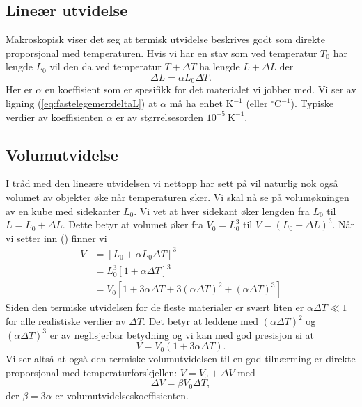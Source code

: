 \subsection{Lineær utvidelse}
Makroskopisk viser det seg at termisk utvidelse beskrives godt som direkte proporsjonal med temperaturen. Hvis vi har en stav som ved temperatur $T_0$ har lengde $L_0$ vil den da ved temperatur $T+\Delta T$ ha lengde $L+\Delta L$ der
\begin{equation}
	\Delta L = \alpha L_0\Delta T.
	\label{eq:fastelegemer:deltaL}
\end{equation}
Her er $\alpha$ en koeffisient som er spesifikk for det materialet vi jobber med. Vi ser av ligning (\ref{eq:fastelegemer:deltaL}) at $\alpha$ må ha enhet $\mathrm{K}^{-1}$ (eller $\mathrm{^\circ C}^{-1}$). Typiske verdier av koeffisienten $\alpha$ er av størrelsesorden $10^{-5}~\mathrm{K}^{-1}$.

\subsection{Volumutvidelse}
I tråd med den lineære utvidelsen vi nettopp har sett på vil naturlig nok også volumet av objekter øke når temperaturen øker. Vi skal nå se på volumøkningen av en kube med sidekanter $L_0$. Vi vet at hver sidekant øker lengden fra $L_0$ til $L = L_0+\Delta L$. Dette betyr at volumet øker fra $V_0 = L_0^3$ til $V = (L_0+\Delta L)^3$. Når vi setter inn 	(\label{eq:fastelegemer:deltaL}) finner vi
\begin{displaymath}
\begin{aligned}
	V &= \left[ L_0 + \alpha L_0 \Delta T\right]^3 \\
	&=L_0^3\left[1+\alpha \Delta T\right]^3 \\
	&=V_0 \left[1 + 3\alpha\Delta T + 3(\alpha\Delta T)^2 + (\alpha\Delta T)^3 \right]
\end{aligned}
\end{displaymath}
Siden den termiske utvidelsen for de fleste materialer er svært liten er $\alpha\Delta T\ll1$ for alle realistiske verdier av $\Delta T$. Det betyr at leddene med $(\alpha\Delta T)^2$ og $(\alpha\Delta T)^3$ er av neglisjerbar betydning og vi kan med god presisjon si at 
\begin{displaymath}
	V = V_0(1+3\alpha\Delta T).
\end{displaymath}
Vi ser altså at også den termiske volumutvidelsen til en god tilnærming er direkte proporsjonal med temperaturforskjellen: $V = V_0 + \Delta V$ med
\begin{equation}
	\Delta V = \beta V_0 \Delta T,
\end{equation}
der $\beta = 3\alpha$ er volumutvidelseskoeffisienten.


